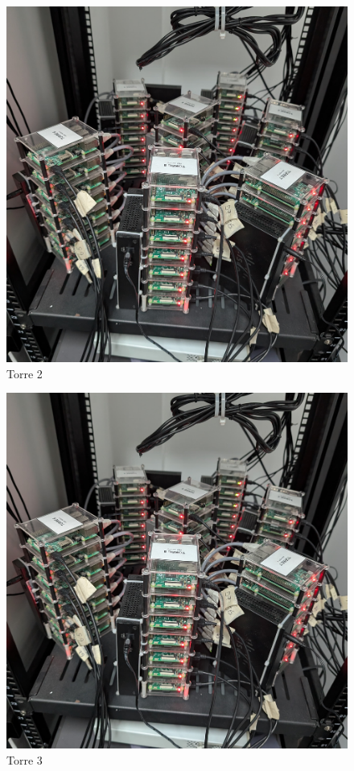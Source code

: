 \hbox{}
\hbox{}
\hbox{}
\hbox{}


\begin{figure}[H]
	\centering
	\includegraphics[scale=0.07]{tablas-images/raspberries/torre-02.jpg}
	\caption{Torre 2}
\end{figure}


\begin{figure}[H]
	\centering
	\includegraphics[scale=0.07]{tablas-images/raspberries/torre-03.jpg}
	\caption{Torre 3}
\end{figure}

